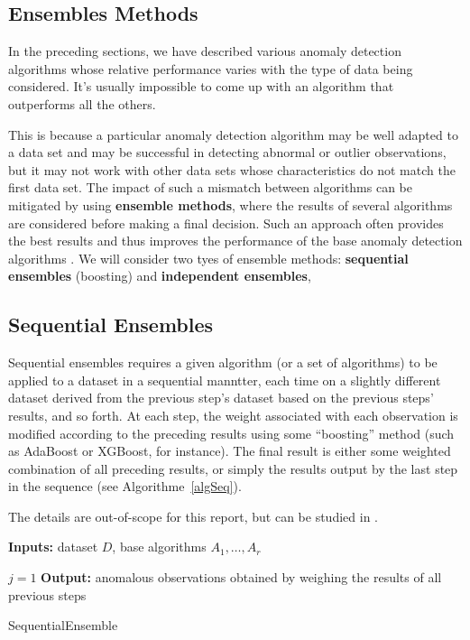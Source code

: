 \subsection{Ensembles Methods}
%
%
In the preceding sections, we have described various anomaly detection algorithms whose relative performance varies with the type of data being considered. It's usually impossible to come up with an algorithm that outperforms all the others. \par This is because a particular anomaly detection algorithm may be well adapted to a data set and may be successful in detecting abnormal or outlier observations, but it may not work with other data sets whose characteristics do not match the first data set. \newl The impact of such a mismatch between algorithms can be mitigated by using  \textbf{ensemble methods}, where the results of several algorithms are considered before making a final decision. Such an approach often provides the best results and thus improves the performance of the base anomaly detection algorithms \cite{A10}. 
\newl We will consider two tyes of ensemble methods:  \textbf{sequential ensembles} (boosting) and \textbf{independent ensembles}, 
\subsection*{Sequential Ensembles}
Sequential ensembles requires a given algorithm (or a set of algorithms) to be applied to a dataset in a sequential manntter, each time on a slightly different dataset derived from the previous step's dataset based on the previous steps' results, and so forth. At each step, the weight associated with each observation is modified according to the preceding results using some ``boosting'' method (such as AdaBoost or XGBoost, for instance). \newl The final result is either some weighted combination of all preceding results, or simply the results output by the last step in the sequence (see Algorithme~\ref{algSeq}). 

The details are out-of-scope for this report, but can be studied in \cite{LB}.

\begin{algorithm}
\SetAlgoLined
\textbf{Inputs:} dataset $D$, base algorithms $A_1,\ldots,A_r$ 

$j=1$\;
\textbf{Output:} anomalous observations obtained by weighing the results of all previous steps 
\caption{SequentialEnsemble}\label{algSeq}
\end{algorithm}%
